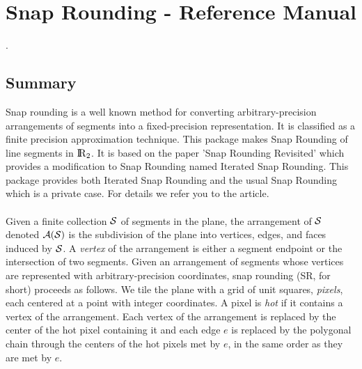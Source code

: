 
\chapter{Snap Rounding - Reference Manual}
\label{chapterSnapRoundibgRef}
\ccChapterRelease\snapRoundingRev. \ \snapRoundingDate\\


\section*{Summary}

Snap rounding is a well known method for converting
arbitrary-precision arrangements of segments into a fixed-precision
representation. It is classified as a finite precision approximation 
technique. This package makes Snap Rounding of line segments in $\reals_2$.
It is based on the paper 'Snap Rounding Revisited' which provides a modification
to Snap Rounding named Iterated Snap Rounding. This package provides both
Iterated Snap Rounding and the usual Snap Rounding which is a private case.
For details we refer you to the article.\\ \\

Given a finite collection $\S$ of segments in the plane, the
arrangement of $\S$ denoted $\A(\S)$ is the subdivision of the plane
into vertices, edges, and faces induced by $\S$. %
A {\it vertex\/} of the arrangement is either a segment endpoint or
the intersection of two segments. Given an arrangement of segments
whose vertices are represented with arbitrary-precision coordinates,
snap rounding (SR, for short) proceeds as follows.  We tile the plane
with a grid of unit squares, {\it pixels}, each centered at a point
with integer coordinates. A pixel is {\it hot\/} if it contains a
vertex of the arrangement. Each vertex of the arrangement is replaced
by the center of the hot pixel containing it and each edge $e$ is
replaced by the polygonal chain through the centers of the hot pixels
met by $e$, in the same order as they are met by $e$.

